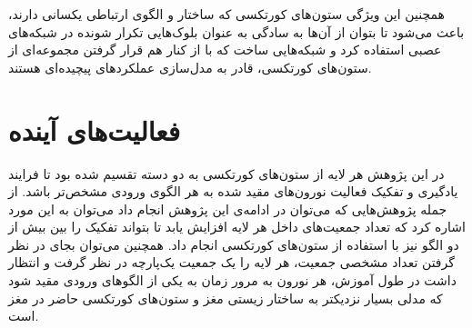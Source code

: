 \documentclass[12pt]{report}
\begin{document}
	همچنین این ویژگی ستون‌های کورتکسی که ساختار و الگوی ارتباطی یکسانی دارند، باعث می‌شود تا بتوان از آن‌ها به سادگی به عنوان بلوک‌هایی تکرار شونده در شبکه‌های عصبی استفاده کرد و شبکه‌هایی ساخت که با از کنار هم قرار گرفتن مجموعه‌ای از ستون‌های کورتکسی، قادر به مدل‌سازی عملکرد‌های پیچیده‌ای هستند.
	
	\section{فعالیت‌های آینده}
	در این پژوهش هر لایه از ستون‌های کورتکسی به دو دسته تقسیم شده بود تا فرایند یادگیری و تفکیک فعالیت نورون‌های مقید شده به هر الگوی ورودی مشخص‌تر باشد. از جمله پژوهش‌هایی که می‌توان در ادامه‌ی این پژوهش انجام داد می‌توان به این مورد اشاره کرد که تعداد جمعیت‌‌های داخل هر لایه افزایش یابد تا بتواند تفکیک را بین بیش از دو الگو نیز با استفاده از ستون‌های کورتکسی انجام داد. همچنین می‌توان بجای در نظر گرفتن تعداد مشخصی جمعیت، هر لایه را یک جمعیت یک‌پارچه در نظر گرفت و انتظار داشت در طول آموزش، هر نورون به مرور زمان به یکی از الگو‌های ورودی مقید شود که  مدلی بسیار نزدیکتر به ساختار زیستی مغز و ستون‌های کورتکسی حاضر در مغز است.

	
	
	
	
	
	
	
	\printglossary[title=واژه‌نامه فارسی به انگلیسی, toctitle=واژه‌نامه فارسی به انگلیسی]
	
	
	\begin{latin}
		
		\renewcommand{\bibname}{\rl{{مراجع}\hfill}}
		
	\end{latin}
	
\end{document}
